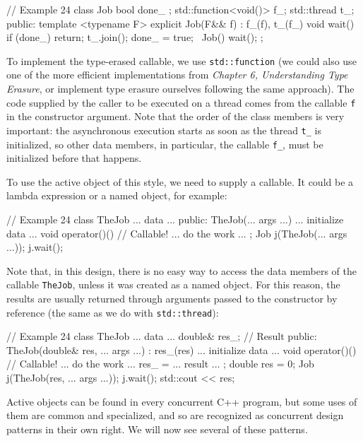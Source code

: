 \begin{code}
// Example 24
class Job {
  bool done_ {};
  std::function<void()> f_;
  std::thread t_;
  public:
  template <typename F> explicit Job(F&& f) :
    f_(f), t_(f_) {}
  void wait() {
     if (done_) return;
     t_.join();
     done_ = true;
  }
  ~Job() { wait(); }
};
\end{code}

To implement the type-erased callable, we use \texttt{std::function} (we could also use one of the more efficient implementations from \emph{Chapter 6, Understanding Type Erasure}, or implement type erasure ourselves following the same approach). The code supplied by the caller to be executed on a thread comes from the callable \texttt{f} in the constructor argument. Note that the order of the class members is very important: the asynchronous execution starts as soon as the thread \texttt{t\_} is initialized, so other data members, in particular, the callable \texttt{f\_}, must be initialized before that happens.

To use the active object of this style, we need to supply a callable. It could be a lambda expression or a named object, for example:

\begin{code}
// Example 24
class TheJob {
  ... data ...
  public:
  TheJob(... args ...) { ... initialize data ... }
  void operator()() { // Callable!
    ... do the work ...
  }
};
Job j(TheJob(... args ...));
j.wait();
\end{code}

Note that, in this design, there is no easy way to access the data members of the callable \texttt{TheJob}, unless it was created as a named object. For this reason, the results are usually returned through arguments passed to the constructor by reference (the same as we do with \texttt{std::thread}):

\begin{code}
// Example 24
class TheJob {
  ... data ...
  double& res_; // Result
  public:
  TheJob(double& res, ... args ...) : res_(res) {
    ... initialize data ...
  }
  void operator()() { // Callable!
    ... do the work ...
    res_ = ... result ...
  }
};
double res = 0;
Job j(TheJob(res, ... args ...));
j.wait();
std::cout << res;
\end{code}

Active objects can be found in every concurrent C++ program, but some uses of them are common and specialized, and so are recognized as concurrent design patterns in their own right. We will now see several of these patterns.

